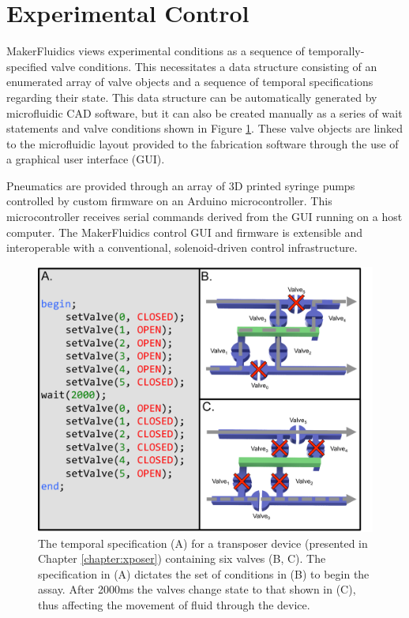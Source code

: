 \section{Experimental Control}
\label{sec:mfControl}
MakerFluidics views experimental conditions as a sequence of temporally-specified valve conditions. This necessitates a data structure consisting of an enumerated array of valve objects and a sequence of temporal specifications regarding their state. This data structure can be automatically generated by microfluidic CAD software, but it can also be created manually as a series of wait statements and valve conditions shown in Figure \ref{fig:sequence}. These valve objects are linked to the microfluidic layout provided to the fabrication software through the use of a graphical user interface (GUI).

Pneumatics are provided through an array of 3D printed syringe pumps controlled by custom firmware on an Arduino microcontroller. This microcontroller receives serial commands derived from the GUI running on a host computer. The MakerFluidics control GUI and firmware is extensible and interoperable with a conventional, solenoid-driven control infrastructure.

\begin{figure}[h]
  \begin{minipage}[t]{0.99\linewidth}\centering
    \includegraphics[width=14cm]{sequence.pdf}
    \medskip
  \end{minipage}\hfill
  \caption[Valving sequence temporal specification]{The temporal specification (A) \cite{thies2008} for a transposer device (presented in Chapter \ref{chapter:xposer}) containing six valves (B, C). The specification in (A) dictates the set of conditions in (B) to begin the assay. After 2000ms the valves change state to that shown in (C), thus affecting the movement of fluid through the device.}
    \label{fig:sequence}
\end{figure}

